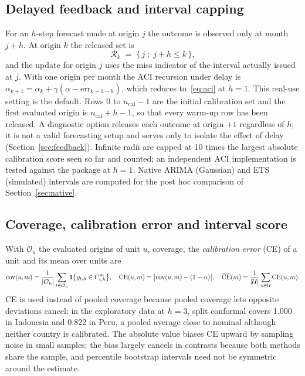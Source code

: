 \subsection{Delayed feedback and interval capping}\label{sec:delay}

For an $h$-step forecast made at origin $j$ the outcome is observed only at month $j+h$. At origin $k$ the released set is
\begin{equation}\label{eq:released}
\mathcal R_k \;=\; \{\,j \;:\; j+h\le k\,\},
\end{equation}
and the update for origin $j$ uses the miss indicator of the interval actually issued at $j$. With one origin per month the ACI recursion under delay is $\alpha_{k+1}=\alpha_k+\gamma(\alpha-\mathrm{err}_{k+1-h})$, which reduces to~\eqref{eq:aci} at $h=1$. This real-use setting is the default. Rows $0$ to $n_{\mathrm{cal}}-1$ are the initial calibration set and the first evaluated origin is $n_{\mathrm{cal}}+h-1$, so that every warm-up row has been released. A diagnostic option releases each outcome at origin $+1$ regardless of $h$; it is not a valid forecasting setup and serves only to isolate the effect of delay (Section~\ref{sec:feedback}). Infinite radii are capped at 10 times the largest absolute calibration score seen so far and counted; an independent ACI implementation is tested against the package at $h=1$. Native ARIMA (Gaussian) and ETS (simulated) intervals are computed for the post hoc comparison of Section~\ref{sec:native}.

\subsection{Coverage, calibration error and interval score}\label{sec:evalmetrics}

With $\mathcal O_u$ the evaluated origins of unit $u$, coverage, the \emph{calibration error} (CE) of a unit and its mean over units are
\begin{equation}\label{eq:ce}
\mathrm{cov}(u,m)=\frac{1}{|\mathcal O_u|}\sum_{t\in\mathcal O_u}\mathbf 1\bigl\{y_{t,h}\in C^{m}_{t,h}\bigr\},\quad
\mathrm{CE}(u,m)=\bigl|\mathrm{cov}(u,m)-(1-\alpha)\bigr|,\quad
\overline{\mathrm{CE}}(m)=\frac{1}{|\mathcal U|}\sum_{u\in\mathcal U}\mathrm{CE}(u,m).
\end{equation}
CE is used instead of pooled coverage because pooled coverage lets opposite deviations cancel: in the exploratory data at $h=3$, split conformal covers 1.000 in Indonesia and 0.822 in Peru, a pooled average close to nominal although neither country is calibrated. The absolute value biases CE upward by sampling noise in small samples; the bias largely cancels in contrasts because both methods share the sample, and percentile bootstrap intervals need not be symmetric around the estimate.

